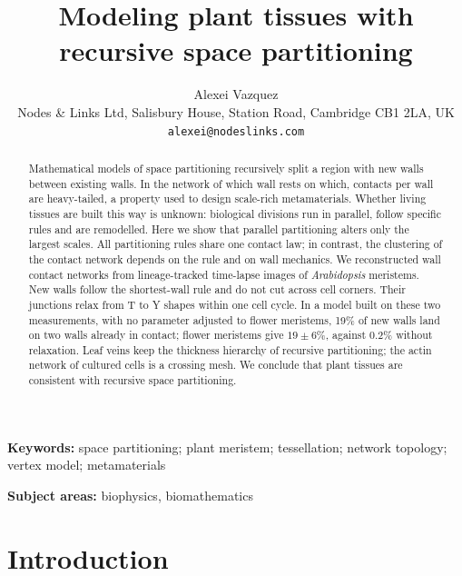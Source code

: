 \documentclass[11pt,a4paper]{article}
\title{Modeling plant tissues with recursive space partitioning}
\author{Alexei Vazquez\\[2pt]
\small Nodes \& Links Ltd, Salisbury House, Station Road, Cambridge CB1 2LA, UK\\
\small \texttt{alexei@nodeslinks.com}}
\date{}
\begin{document}
\maketitle

\begin{abstract}
\noindent Mathematical models of space partitioning recursively split a region with new walls
between existing walls. In the network of which wall rests on which, contacts per wall are
heavy-tailed, a property used to design scale-rich metamaterials. Whether living tissues are
built this way is unknown: biological divisions run in parallel, follow specific rules and are
remodelled. Here we show that parallel partitioning alters only the largest scales. All
partitioning rules share one contact law; in contrast, the clustering of the contact network
depends on the rule and on wall mechanics. We reconstructed wall contact networks from
lineage-tracked time-lapse images of \textit{Arabidopsis} meristems. New walls follow the
shortest-wall rule and do not cut across cell corners. Their junctions relax from T to Y
shapes within one cell cycle. In a model built on these two measurements, with no parameter
adjusted to flower meristems, 19\% of new walls land on two walls already in contact; flower
meristems give $19\pm6\%$, against $0.2\%$ without relaxation. Leaf veins keep the thickness
hierarchy of recursive partitioning; the actin network of cultured cells is a crossing mesh.
We conclude that plant tissues are consistent with recursive space partitioning.
\end{abstract}

\noindent\textbf{Keywords:} space partitioning; plant meristem; tessellation; network topology;
vertex model; metamaterials

\noindent\textbf{Subject areas:} biophysics, biomathematics

\section{Introduction}
\end{document}
